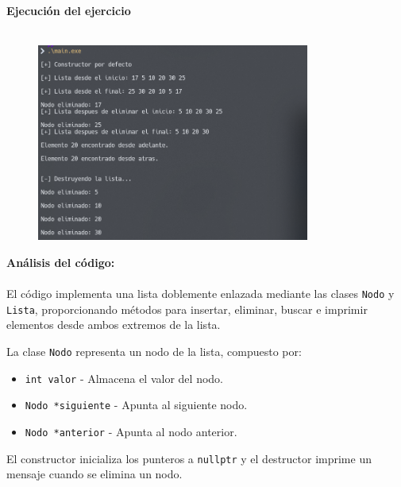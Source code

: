 \documentclass{article}
\begin{document}
        

        
        
        

        \textbf{Ejecución del ejercicio} \\\\
        \begin{figure}[H]
        	\centering
         	\includegraphics[width=0.8\textwidth,keepaspectratio]{img/ejercicio3.png}
        \end{figure}

        \textbf{Análisis del código:}  \\\\
        El código implementa una lista doblemente enlazada mediante las clases \texttt{Nodo} y \texttt{Lista}, proporcionando métodos para insertar, eliminar, buscar e imprimir elementos desde ambos extremos de la lista.
        
        La clase \texttt{Nodo} representa un nodo de la lista, compuesto por:
        \begin{itemize}
            \item \texttt{int valor} - Almacena el valor del nodo.
            \item \texttt{Nodo *siguiente} - Apunta al siguiente nodo.
            \item \texttt{Nodo *anterior} - Apunta al nodo anterior.
        \end{itemize}
        El constructor inicializa los punteros a \texttt{nullptr} y el destructor imprime un mensaje cuando se elimina un nodo.
        
\end{document}
